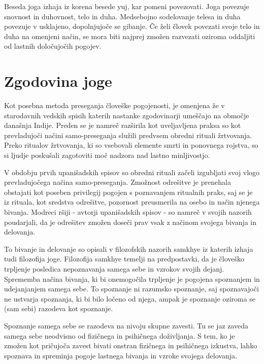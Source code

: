 \documentclass[a4paper, 12pt]{book}
\begin{document}
Beseda joga izhaja iz korena besede yuj, kar pomeni povezovati. Joga povezuje snovnost in duhovnost, telo in duha. Medsebojno sodelovanje telesa in duha povezuje v usklajeno, dopolnjujoče se gibanje. Če želi človek povezati svoje telo in duha na omenjeni način, se mora biti najprej zmožen razvezati oziroma oddaljiti od lastnih določujočih pogojev.~\cite{oJogi}\\ 

\section{Zgodovina joge}
Kot posebna metoda preseganja človeške pogojenosti, je omenjena že v starodavnih vedskih spisih katerih nastanke zgodovinarji umeščajo na območje današnja Indije. Preden se je namreč razširila kot uveljavljena praksa so kot prevladujoči načini samo-preseganja služili predvsem obredni rituali žrtvovanja. Preko ritualov žrtvovanja, ki so vsebovali elemente smrti in ponovnega rojstva, so si ljudje poskušali zagotoviti moč nadzora nad lastno minljivostjo. 

V obdobju prvih upanišadskih spisov so obredni rituali začeli izgubljati svoj vlogo prevladujočega načina samo-preseganja. Zmožnost odrešitve je prenehala obstajati kot poseben privilegij pogojen s poznavanjem ritualnih praks, saj se je iz rituala, kot sredstva odrešitve, pozornost preusmerila na osebo in način njenega bivanja. Modreci ršiji - avtorji upanišadskih spisov - so namreč v svojih nazorih poudarjali, da je odrešitev zmožen doseči prav vsak z načinom svojega bivanja in delovanja.

To bivanje in delovanje so opisali v filozofskih nazorih samkhye iz katerih izhaja tudi filozofija joge. Filozofija samkhye temelji na predpostavki, da je človeško trpljenje posledica nepoznavanja samega sebe in vzrokov svojih dejanj. Sprememba načina bivanja, ki bi onemogočila trpljenje je pogojena spoznanjem in udejanjanjem samega sebe. To spoznanje ni razumsko spoznanje, saj spoznavajoči ne ustvarja spoznanja, ki bi bilo ločeno od njega, ampak je spoznanje oziroma se (sam sebi) razodeva kot spoznanje.

Spoznanje samega sebe se razodeva na nivoju skupne zavesti. Tu se jaz zaveda samega sebe neodvisno od fizičnega in psihičnega doživljanja. S tem, ko je zmožen kot pričujoča zavest bivati onstran fizičnega in psihičnega izkustva, lahko spoznava in spreminja pogoje lastnega bivanja in vzroke svojega delovanja. \\
\end{document}
